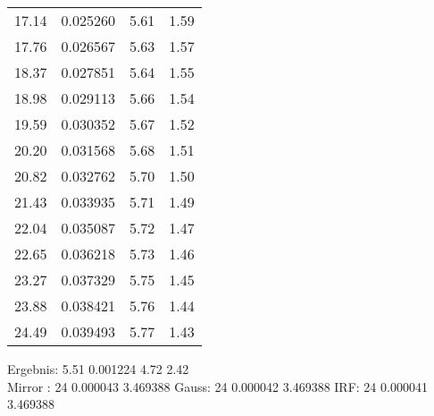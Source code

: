 \begin{center}
\begin{tabular}{c | c c c}
        17.14 &  0.025260 &  5.61 &  1.59 \\
        17.76 &  0.026567 &  5.63 &  1.57 \\
        18.37 &  0.027851 &  5.64 &  1.55 \\
        18.98 &  0.029113 &  5.66 &  1.54 \\
        19.59 &  0.030352 &  5.67 &  1.52 \\
        20.20 &  0.031568 &  5.68 &  1.51 \\
        20.82 &  0.032762 &  5.70 &  1.50 \\
        21.43 &  0.033935 &  5.71 &  1.49 \\
        22.04 &  0.035087 &  5.72 &  1.47 \\
        22.65 &  0.036218 &  5.73 &  1.46 \\
        23.27 &  0.037329 &  5.75 &  1.45 \\
        23.88 &  0.038421 &  5.76 &  1.44 \\
        24.49 &  0.039493 &  5.77 &  1.43 \\
    \end{tabular}
\end{center}

Ergebnis:  5.51  0.001224  4.72  2.42 \\



Mirror : 24 0.000043  3.469388
Gauss: 24 0.000042  3.469388
IRF: 24  0.000041  3.469388